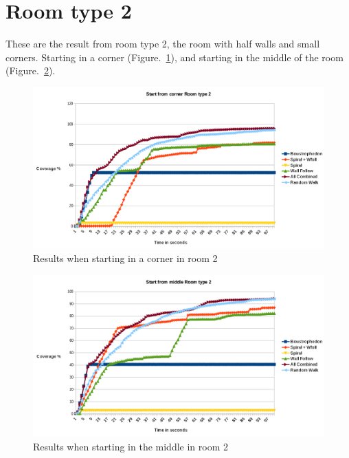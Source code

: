 \documentclass[bachelor]{kththesis}
\begin{document}
\section{Room type 2}
These are the result from room type 2, the room with half walls and small corners. Starting in a corner (Figure.~\ref{fig:corner2}), and starting in the middle of the room (Figure.~\ref{fig:middle2}).
\begin{figure}[H]
	\includegraphics[width=15cm]{img/cornerroom2chart.png}
	\centering
	\caption{Results when starting in a corner in room 2}
	\label{fig:corner2}
\end{figure}
\begin{figure}[H]
	\includegraphics[width=15cm]{img/middleroom2chart.png}
	\centering
	\caption{Results when starting in the middle in room 2}
	\label{fig:middle2}
\end{figure}
\end{document}
